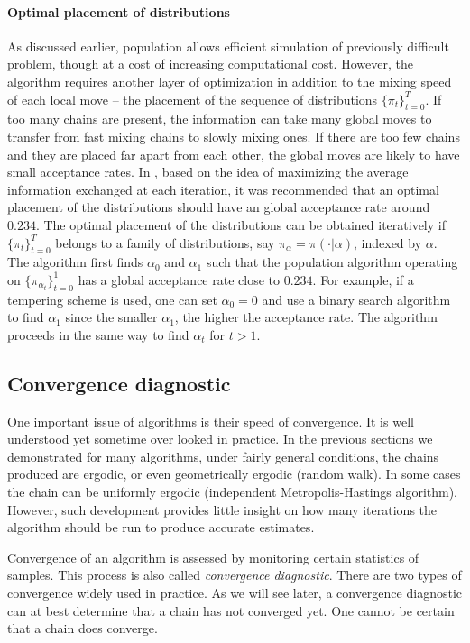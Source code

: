 \paragraph{Optimal placement of distributions}

As discussed earlier, population \mcmc allows efficient simulation of
previously difficult problem, though at a cost of increasing computational
cost. However, the algorithm requires another layer of optimization in
addition to the mixing speed of each local move -- the placement of the
sequence of distributions $\{\pi_t\}_{t=0}^T$. If too many chains are
present, the information can take many global moves to transfer from fast
mixing chains to slowly mixing ones. If there are too few chains and they are
placed far apart from each other, the global moves are likely to have small
acceptance rates. In \cite{Atchade:2010ha}, based on the idea of maximizing
the average information exchanged at each iteration, it was recommended that
an optimal placement of the distributions should have an global acceptance
rate around $0.234$. The optimal placement of the distributions can be
obtained iteratively if $\{\pi_t\}_{t=0}^T$ belongs to a family of
distributions, say $\pi_{\alpha} = \pi(\cdot|\alpha)$, indexed by $\alpha$.
The algorithm first finds $\alpha_0$ and $\alpha_1$ such that the population
\mcmc algorithm operating on $\{\pi_{\alpha_t}\}_{t=0}^1$ has a global
acceptance rate close to $0.234$. For example, if a tempering scheme is used,
one can set $\alpha_0 = 0$ and use a binary search algorithm to find
$\alpha_1$ since the smaller $\alpha_1$, the higher the acceptance rate. The
algorithm proceeds in the same way to find $\alpha_t$ for $t>1$.

\subsection{Convergence diagnostic}
\label{sub:Convergence diagnostic}

One important issue of \mcmc algorithms is their speed of convergence. It is
well understood yet sometime over looked in practice. In the previous
sections we demonstrated for many algorithms, under fairly general
conditions, the chains produced are ergodic, or even geometrically ergodic
(random walk). In some cases the chain can be uniformly ergodic (independent
Metropolis-Hastings algorithm). However, such development provides little
insight on how many iterations the algorithm should be run to produce
accurate estimates.

Convergence of an \mcmc algorithm is assessed by monitoring certain
statistics of samples. This process is also called \emph{convergence
diagnostic}. There are two types of convergence
\cite[][chap.~12]{Robert:2004tn} widely used in practice. As we will see
later, a convergence diagnostic can at best determine that a chain has not
converged yet. One cannot be certain that a chain does converge.


